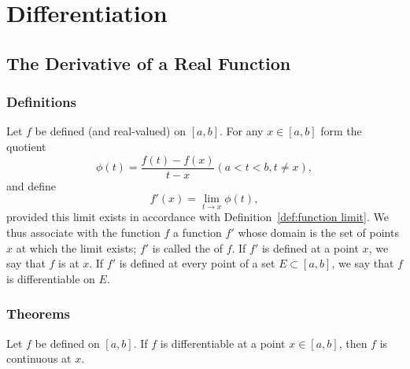 \chapter{Differentiation}

\section{The Derivative of a Real Function}
\subsection{Definitions}
\begin{deff}
	Let $f$ be defined (and real-valued) on $[a,b]$. For any $x \in [a,b]$ form the quotient $$\phi(t) = \frac{f(t)-f(x)}{t-x} (a<t<b, t \ne x),$$ and define $$f'(x) = \lim_{t \to x} \phi(t),$$ provided this limit exists in accordance with Definition~\ref{def:function limit}. We thus associate with the function $f$ a function $f'$ whose domain is the set of points $x$ at which the limit exists; $f'$ is called the {} of $f$. If $f'$ is defined at a point $x$, we say that $f$ is {} at $x$. If $f'$ is defined at every point of a set $E \subset [a,b]$, we say that $f$ is differentiable on $E$.
\end{deff}

\subsection{Theorems}
\begin{thm}
	Let $f$ be defined on $[a,b]$. If $f$ is differentiable at a point $x \in [a,b]$, then $f$ is continuous at $x$. 
\end{thm}



